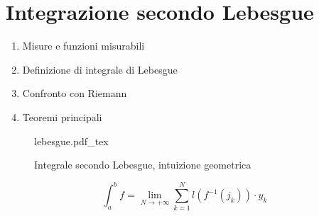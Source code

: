 \documentclass[a4paper]{article}
\newcommand{\incfig}[1]{%
	\def\svgwidth{\columnwidth}
	{#1.pdf_tex}
}
\begin{document}
\section{Integrazione secondo Lebesgue}
\begin{enumerate}
	\item Misure e funzioni misurabili
	\item Definizione di integrale di Lebesgue
	\item Confronto con Riemann
	\item Teoremi principali
\end{enumerate}
\begin{figure}[ht]
    \centering
    \incfig{lebesgue}
    \caption{Integrale secondo Lebesgue, intuizione geometrica}
    \label{fig:lebesgue}
\end{figure}
\[\int_{a}^{b} f=\lim_{N \to +\infty} \sum_{k=1}^{N}l(f^{-1}(j_k))\cdot y_k\]
\end{document}
